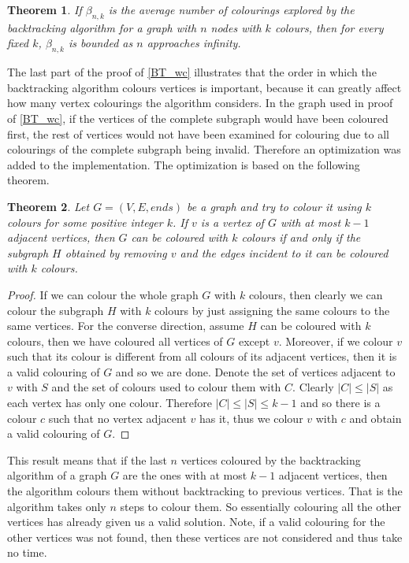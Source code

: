 \documentclass{report}
\theoremstyle{plain}
\newtheorem{theorem}{Theorem}
\theoremstyle{definition}
\theoremstyle{remark}
\numberwithin{definition}{chapter}
\numberwithin{example}{chapter}
\numberwithin{figure}{chapter}
\numberwithin{theorem}{chapter}
\numberwithin{lemma}{chapter}
\begin{document}
\begin{theorem}
If $\beta_{n,k}$ is the average number of colourings explored by the backtracking algorithm for a graph with $n$ nodes with $k$ colours, then for every fixed $k$, $\beta_{n,k}$ is bounded as $n$ approaches infinity.
\end{theorem}

The last part of the proof of \ref{BT_wc} illustrates that the order in which the backtracking algorithm colours vertices is important, because it can greatly affect how many vertex colourings the algorithm considers. In the graph used in proof of \ref{BT_wc}, if the vertices of the complete subgraph would have been coloured first, the rest of vertices would not have been examined for colouring due to all colourings of the complete subgraph being invalid. Therefore an optimization was added to the implementation. The optimization is based on the following theorem.

\begin{theorem}
Let $G=(V,E,ends)$ be a graph and try to colour it using $k$ colours for some positive integer $k$. If $v$ is a vertex of $G$ with at most $k-1$ adjacent vertices, then $G$ can be coloured with $k$ colours if and only if the subgraph $H$ obtained by removing $v$ and the edges incident to it can be coloured with $k$ colours.
\label{BT_opt}
\end{theorem}

\begin{proof}
If we can colour the whole graph $G$ with $k$ colours, then clearly we can colour the subgraph $H$ with $k$ colours by just assigning the same colours to the same vertices. For the converse direction, assume $H$ can be coloured with $k$ colours, then we have coloured all vertices of $G$ except $v$. Moreover, if we colour  $v$ such that its colour is different from all colours of its adjacent vertices, then it is a valid colouring of $G$ and so we are done.  Denote the set of vertices adjacent to $v$ with $S$ and the set of colours used to colour them with $C$. Clearly $|C| \leq |S|$ as each vertex has only one colour. Therefore $|C| \leq |S| \leq k - 1$ and so there is a colour $c$ such that no vertex adjacent $v$ has it, thus we colour $v$ with $c$ and obtain a valid colouring of $G$.
\end{proof}

This result means that if the last $n$ vertices coloured by the backtracking algorithm of a graph $G$ are the ones with at most $k-1$ adjacent vertices, then the algorithm colours them without backtracking to previous vertices. That is the algorithm takes only $n$ steps to colour them. So essentially colouring all the other vertices has already given us a valid solution. Note, if a valid colouring for the other vertices was not found, then these vertices are not considered and thus take no time. 
\end{document}
